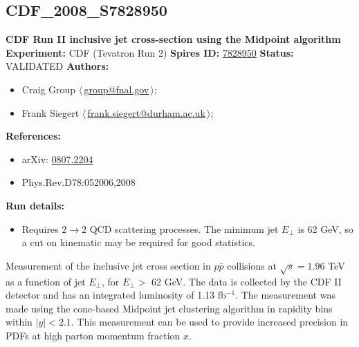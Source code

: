 \clearpage


\clearpage

\subsection[CDF\_2008\_S7828950]{CDF\_2008\_S7828950\,\cite{Aaltonen:2008eq}}
\textbf{CDF Run II inclusive jet cross-section using the Midpoint algorithm}\newline
\textbf{Experiment:} CDF (Tevatron Run 2) \newline
\textbf{Spires ID:} \href{http://www.slac.stanford.edu/spires/find/hep/www?rawcmd=key+7828950}{7828950}\newline
\textbf{Status:} VALIDATED\newline
\textbf{Authors:}
\begin{itemize}
  \item Craig Group $\langle\,$\href{mailto:group@fnal.gov}{group@fnal.gov}$\,\rangle$;
  \item Frank Siegert $\langle\,$\href{mailto:frank.siegert@durham.ac.uk}{frank.siegert@durham.ac.uk}$\,\rangle$;
\end{itemize}
\textbf{References:}
\begin{itemize}
  \item arXiv: \href{http://arxiv.org/abs/0807.2204}{0807.2204}
  \item Phys.Rev.D78:052006,2008
\end{itemize}
\textbf{Run details:}
\begin{itemize}

  \item Requires $2\rightarrow{2}$ QCD scattering processes. The minimum jet $E_\perp$ is 62 GeV, so a cut on kinematic \pTmin may be required for good statistics.\end{itemize}

\noindent Measurement of the inclusive jet cross section in $p\bar{p}$ collisions at $\sqrt{s}=1.96$ TeV as a function of jet $E_\perp$, for $E_\perp >$ 62 GeV. The data is collected by the CDF II detector and has an integrated luminosity of 1.13 fb$^{-1}$. The measurement was made using the cone-based Midpoint jet clustering algorithm in rapidity bins within $|y|<2.1$. This measurement can be used to provide increased precision in PDFs at high parton momentum fraction $x$.

\clearpage


\clearpage

